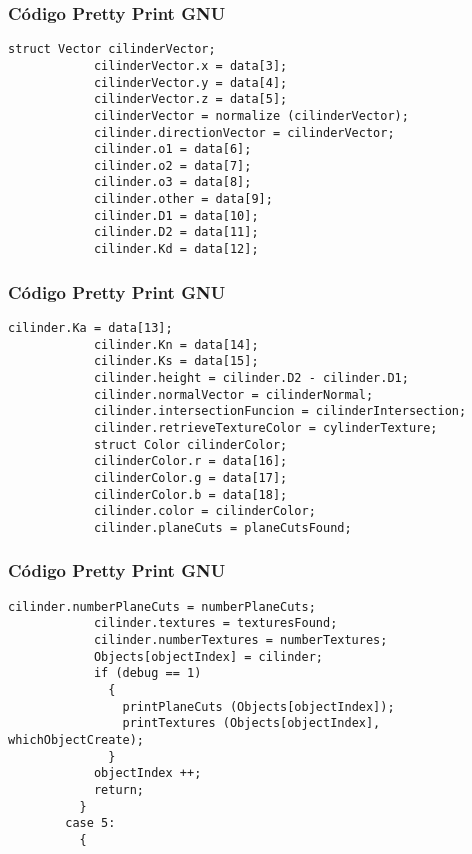\documentclass{beamer}
\begin{document}
\begin{frame}[fragile]
\frametitle{C\'odigo Pretty Print GNU}
\begin{lstlisting}[style=CStyle]
            struct Vector cilinderVector;
            cilinderVector.x = data[3];
            cilinderVector.y = data[4];
            cilinderVector.z = data[5];
            cilinderVector = normalize (cilinderVector);
            cilinder.directionVector = cilinderVector;
            cilinder.o1 = data[6];
            cilinder.o2 = data[7];
            cilinder.o3 = data[8];
            cilinder.other = data[9];
            cilinder.D1 = data[10];
            cilinder.D2 = data[11];
            cilinder.Kd = data[12];
\end{lstlisting}
\end{frame}
\begin{frame}[fragile]
\frametitle{C\'odigo Pretty Print GNU}
\begin{lstlisting}[style=CStyle]
            cilinder.Ka = data[13];
            cilinder.Kn = data[14];
            cilinder.Ks = data[15];
            cilinder.height = cilinder.D2 - cilinder.D1;
            cilinder.normalVector = cilinderNormal;
            cilinder.intersectionFuncion = cilinderIntersection;
            cilinder.retrieveTextureColor = cylinderTexture;
            struct Color cilinderColor;
            cilinderColor.r = data[16];
            cilinderColor.g = data[17];
            cilinderColor.b = data[18];
            cilinder.color = cilinderColor;
            cilinder.planeCuts = planeCutsFound;
\end{lstlisting}
\end{frame}
\begin{frame}[fragile]
\frametitle{C\'odigo Pretty Print GNU}
\begin{lstlisting}[style=CStyle]
            cilinder.numberPlaneCuts = numberPlaneCuts;
            cilinder.textures = texturesFound;
            cilinder.numberTextures = numberTextures;
            Objects[objectIndex] = cilinder;
            if (debug == 1)
              {
                printPlaneCuts (Objects[objectIndex]);
                printTextures (Objects[objectIndex], whichObjectCreate);
              }
            objectIndex ++;
            return;
          }
        case 5:
          {
            \end{lstlisting}
\end{frame}
\end{document}
